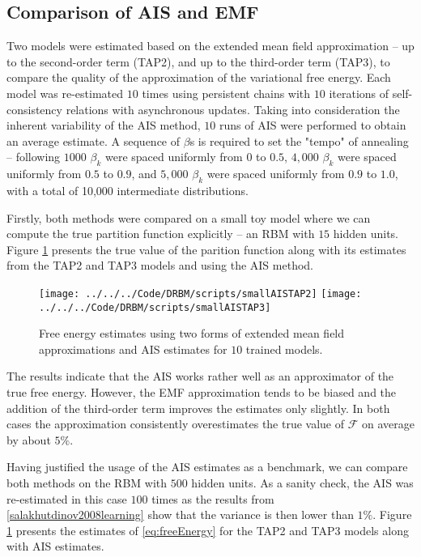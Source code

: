 \subsection{Comparison of AIS and EMF}
Two models were estimated based on the extended mean field approximation -- up to the second-order term (TAP2), and up to the third-order term (TAP3), to compare the quality of the approximation of the variational free energy.
Each model was re-estimated $10$ times using persistent chains with $10$ iterations of self-consistency relations with asynchronous updates. Taking into consideration the inherent variability of the AIS method, $10$ runs of AIS were performed to obtain an average estimate.  A sequence of $\beta$s is required to set the "tempo" of annealing -- following \cite{salakhutdinov2008learning} $1000$ $\beta_k$ were spaced uniformly from  $0 $ to  $0.5$, $4,000$ $\beta_k$ were spaced uniformly from $0.5$ to $0.9$, and $5,000$ $\beta_k$ were spaced uniformly from $0.9$ to $1.0$, with a total of 10,000 intermediate distributions. 

Firstly, both methods were compared on a small toy model where we can compute the true partition function explicitly -- an RBM with $15$ hidden units. Figure \ref{fig:AISTAP2small} presents the true value of the parition function along with its estimates from the TAP2 and TAP3 models and using the AIS method.

\begin{figure}[!htb]
%
 \texttt{[image: ../../../Code/DRBM/scripts/smallAISTAP2]}
\endminipage 
{}  
\texttt{[image: ../../../Code/DRBM/scripts/smallAISTAP3]}
\endminipage\hfill
  \caption[Comparison of AIS and EMF on toy RBM]{Free energy estimates using two forms of extended mean field approximations and AIS estimates for $10$ trained models.}
  \label{fig:AISTAP2small}
\end{figure}

The results indicate that the AIS works rather well as an approximator of the true free energy. However, the EMF approximation tends to be biased and the addition of the third-order term improves the estimates only slightly. In both cases the approximation consistently overestimates the true value of $\mathcal{F}$ on average by about $5\%$. 

Having justified the usage of the AIS estimates as a benchmark, we can compare both methods on the RBM with $500$ hidden units. As a sanity check, the AIS was re-estimated in this case $100$ times as the results from \ref{salakhutdinov2008learning} show that the variance is then lower than $1\%$. Figure \ref{fig:AISTAP2small} presents the estimates of \ref{eq:freeEnergy} for the TAP2 and TAP3 models along with AIS estimates.

